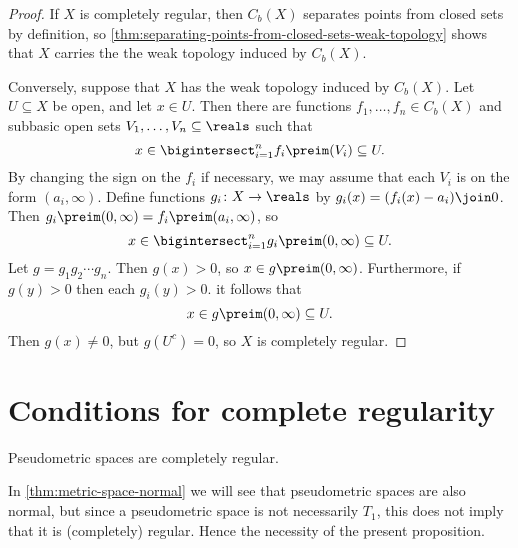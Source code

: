 \documentclass[article, a4paper, 11pt, oneside]{memoir}
\numberwithin{equation}{chapter}
\begin{document}
\begin{proof}
    If $X$ is completely regular, then $C_b(X)$ separates points from closed sets by definition, so \cref{thm:separating-points-from-closed-sets-weak-topology} shows that $X$ carries the the weak topology induced by $C_b(X)$.

    Conversely, suppose that $X$ has the weak topology induced by $C_b(X)$. Let $U \subseteq X$ be open, and let $x \in U$. Then there are functions $f_1, \ldots, f_n \in C_b(X)$ and subbasic open sets $V_1, \ldots, V_n \subseteq \reals$ such that
    \begin{equation*}
        x
            \in \bigintersect_{i=1}^n f_i\preim(V_i)
            \subseteq U.
    \end{equation*}
    By changing the sign on the $f_i$ if necessary, we may assume that each $V_i$ is on the form $(a_i, \infty)$. Define functions $g_i \colon X \to \reals$ by $g_i(x) = (f_i(x) - a_i) \join 0$. Then $g_i\preim(0,\infty) = f_i\preim(a_i,\infty)$, so
    \begin{equation*}
        x
            \in \bigintersect_{i=1}^n g_i\preim(0,\infty)
            \subseteq U.
    \end{equation*}
    Let $g = g_1 g_2 \cdots g_n$. Then $g(x) > 0$, so $x \in g\preim(0,\infty)$. Furthermore, if $g(y) > 0$ then each $g_i(y) > 0$. it follows that
    \begin{equation*}
        x
            \in g\preim(0,\infty)
            \subseteq U.
    \end{equation*}
    Then $g(x) \neq 0$, but $g(U^c) = 0$, so $X$ is completely regular.
\end{proof}



    


\section{Conditions for complete regularity}

\begin{proposition}
    \label{thm:pseudometric-completely-regular}
    Pseudometric spaces are completely regular.
\end{proposition}
%
In \cref{thm:metric-space-normal} we will see that pseudometric spaces are also normal, but since a pseudometric space is not necessarily $T_1$, this does not imply that it is (completely) regular. Hence the necessity of the present proposition.
\end{document}
